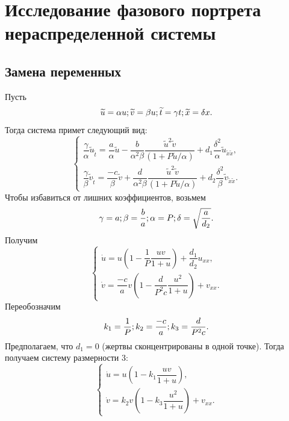\documentclass[oneside, final, 12pt]{article}
\begin{document}
\newpage
\section{Исследование фазового портрета нераспределенной системы}						%
\subsection{Замена переменных}
Пусть
\[
    \widetilde{u} = \alpha u;\\
    \widetilde{v} = \beta u;\\
    \widetilde{t} = \gamma t;\\
    \widetilde{x} = \delta x.
\]
Тогда система примет следующий вид:
\[
    \begin{cases}
        \dfrac{\gamma}{\alpha} \widetilde{u}_{\widetilde{t}} =
        \dfrac{a}{\alpha}\widetilde{u}
        - \dfrac{b}{\alpha^2\beta} \dfrac{\widetilde{u}^2\widetilde{v}}{(1 + P\widetilde{u}/\alpha)}
        + d_1\dfrac{\delta^2}{\alpha} \widetilde{u}_{\widetilde{x}\widetilde{x}}, \\

        \dfrac{\gamma}{\beta} \widetilde{v}_{\widetilde{t}} =
        \dfrac{-c}{\beta}\widetilde{v}
        + \dfrac{d}{\alpha^2\beta} \dfrac{\widetilde{u}^2\widetilde{v}}{(1 + P\widetilde{u}/\alpha)}
        + d_2\dfrac{\delta^2}{\beta} \widetilde{v}_{\widetilde{x}\widetilde{x}}.
    \end{cases}
\]
Чтобы избавиться от лишних коэффициентов, возьмем
\[
    \gamma = a;\\
    \beta = \dfrac{b}{a};\\
    \alpha = P;\\
    \delta = \sqrt{\dfrac{a}{d_2}}.
\]
Получим
\[
    \begin{cases}
        \dot{u} = u\left(1 - \dfrac{1}{P} \dfrac{uv}{1 + u}\right)  + \dfrac{d_1}{d_2}u_{xx}, \\
        \dot{v} = \dfrac{-c}{a} v\left(1 - \dfrac{d}{P^{2}c} \dfrac{u^2}{1 + u}\right) + v_{xx}.
    \end{cases}
\]
Переобозначим
\[
    k_1 = \dfrac{1}{P};\\
    k_2 = \dfrac{-c}{a};\\
    k_3 = \dfrac{d}{P^{2}c}.
\]
Предполагаем, что \(d_1 = 0\) (жертвы сконцентрированы в одной точке). Тогда получаем систему размерности 3:
\[
    \begin{cases}
        \dot{u} = u\left(1 -  k_1\dfrac{uv}{1 + u}\right) , \\
        \dot{v} = k_2 v\left(1 - k_3 \dfrac{u^2}{1 + u}\right) + v_{xx}.
    \end{cases}
\]
\end{document}
